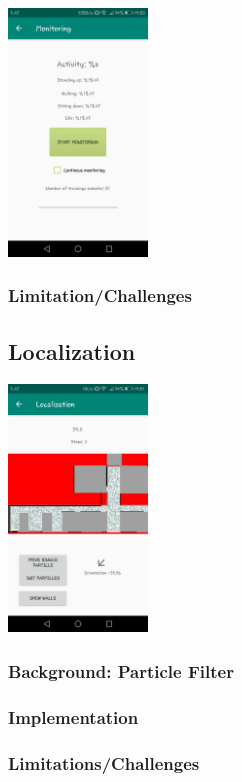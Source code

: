 \documentclass[12pt]{article}
\begin{document}
\begin{center}
  \includegraphics[width=140px]{images/monitoring.jpeg}
\end{center}

\pagebreak

\subsubsection{Limitation/Challenges}


\subsection{Localization}

\begin{center}
	\includegraphics[width=140px]{images/localization}
\end{center}

\subsubsection{Background: Particle Filter}

\subsubsection{Implementation}

\subsubsection{Limitations/Challenges}


\end{document}
